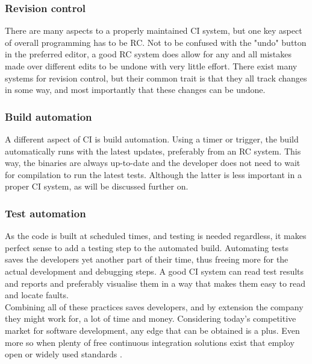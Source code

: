 \documentclass[11pt,british]{article}
\begin{document}
\subsubsection{Revision control}
There are many aspects to a properly maintained \gls{CI} system, but one key aspect of overall programming has to be \gls{RC}. Not to be confused with the "undo" button in the preferred editor, a good \gls{RC} system does allow for any and all mistakes made over different edits to be undone with very little effort. There exist many systems for revision control, but their common trait is that they all track changes in some way, and most importantly that these changes can be undone. 

\subsubsection{Build automation}
A different aspect of CI is build automation. Using a timer or trigger, the build automatically runs with the latest updates, preferably from an \gls{RC} system. This way, the binaries are always up-to-date and the developer does not need to wait for compilation to run the latest tests. Although the latter is less important in a proper \gls{CI} system, as will be discussed further on. 

\subsubsection{Test automation}
As the code is built at scheduled times, and testing is needed regardless, it makes perfect sense to add a testing step to the automated build. Automating tests saves the developers yet another part of their time, thus freeing more for the actual development and debugging steps. A good \gls{CI} system can read test results and reports and preferably visualise them in a way that makes them easy to read and locate faults.
\\[\baselineskip]
Combining all of these practices saves developers, and by extension the company they might work for, a lot of time and money. Considering today's competitive market for software development, any edge that can be obtained is a plus. Even more so when plenty of free continuous integration solutions exist that employ open or widely used standards \cite{ci1,ci2,ci3}.
\end{document}
